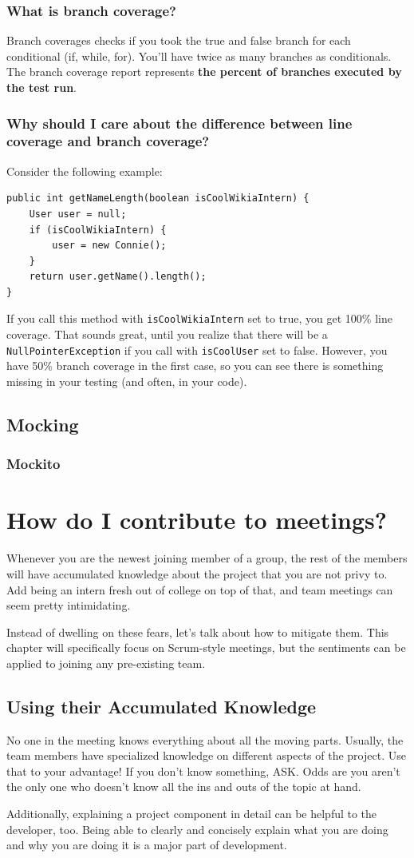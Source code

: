 \documentclass[oneside]{book}
\begin{document}
\subsection{What is branch coverage?}
Branch coverages checks if you took the true and false branch for each conditional (if, while, for). You'll have twice as many branches as conditionals. The branch coverage report represents \textbf{the percent of branches executed by the test run}.
\subsection{Why should I care about the difference between line coverage and branch coverage?}
Consider the following example: \\
\begin{lstlisting}
public int getNameLength(boolean isCoolWikiaIntern) {
    User user = null;
    if (isCoolWikiaIntern) {
        user = new Connie(); 
    }
    return user.getName().length(); 
}
\end{lstlisting}
If you call this method with \texttt{isCoolWikiaIntern} set to true, you get 100\% line coverage. That sounds great, until you realize that there will be a \texttt{NullPointerException} if you call with \texttt{isCoolUser} set to false. However, you have 50\% branch coverage in the first case, so you can see there is something missing in your testing (and often, in your code).
\section{Mocking}
\subsection{Mockito}
\chapter{How do I contribute to meetings?}
Whenever you are the newest joining member of a group, the rest of the members will have accumulated knowledge about the project that you are not privy to. Add being an intern fresh out of college on top of that, and team meetings can seem pretty intimidating.\par
Instead of dwelling on these fears, let's talk about how to mitigate them. This chapter will specifically focus on Scrum-style meetings, but the sentiments can be applied to joining any pre-existing team.
\section{Using their Accumulated Knowledge}
No one in the meeting knows everything about all the moving parts. Usually, the team members have specialized knowledge on different aspects of the project. Use that to your advantage! If you don't know something, ASK. Odds are you aren't the only one who doesn't know all the ins and outs of the topic at hand.\par
Additionally, explaining a project component in detail can be helpful to the developer, too. Being able to clearly and concisely explain what you are doing and why you are doing it is a major part of development. 
\end{document}
